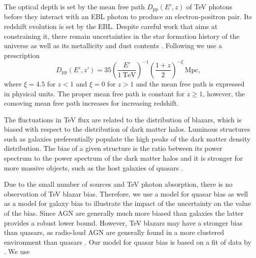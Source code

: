 \documentclass[numberedappendix]{emulateapj}
\begin{document}
The optical depth is set by the mean free path $D_\mathrm{pp}(E',z)$ of TeV photons before they interact with an EBL photon to produce an electron-positron pair. Its redshift evolution is set by the EBL. Despite careful work that aims at constraining it, there remain uncertainties in the star formation history of the universe as well as its metallicity and dust contents \citep[see, e.g.][]{2008A&A...487..837F,2006ApJ...648..774S}. Following \citet{2012ApJ...752...23C} we use a prescription
\begin{equation}
\label{eq:mean_free_path}
D_{\mathrm{pp}}(E',z')=35\left(\frac{E'}{1~\textrm{TeV}}\right)^{-1} \left(\frac{1+z}{2}\right)^{-\xi}~\textrm{Mpc,}
\end{equation}
where $\xi=4.5$ for $z<1$ and $\xi=0$ for $z>1$ \citep{2004A&A...413..807K,2009PhRvD..80l3012N} and the mean free path is expressed in physical units. The proper mean free path is constant for $z\geq 1$, however, the comoving mean free path increases for increasing redshift.

The fluctuations in TeV flux are related to the distribution of blazars, which is biased with respect to the distribution of dark matter halos. Luminous structures such as galaxies preferentially populate the high peaks of the dark matter density distribution. The bias of a given structure is the ratio between its power spectrum to the power spectrum of the dark matter halos and it is stronger for more massive objects, such as the host galaxies of quasars \citep[see, e.g.][for a review]{2002PhR...372....1C}.

Due to the small number of sources and TeV photon absorption, there is no observation of TeV blazar bias.  Therefore, we  use a model for quasar bias as well as a model for galaxy bias to illustrate the impact of the uncertainty on the value of the bias. Since AGN are generally much more biased than galaxies the latter provides a robust lower bound. However, TeV blazars may have a stronger bias than quasars, as radio-loud AGN are generally found in a more clustered environment than quasars \citep{2009MNRAS.393..377M,2012MNRAS.421.3060S}. Our model for quasar bias is based on a fit of data by \citet{2005MNRAS.356..415C,2007ApJ...658...85M,2007AJ....133.2222S}. We use
\end{document}
